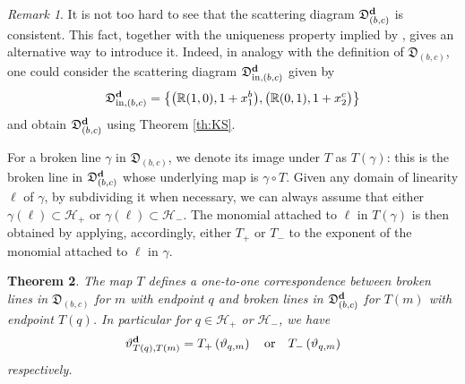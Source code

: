 \documentclass[11pt]{amsart}
\newtheorem{theorem}{Theorem}[section]
\theoremstyle{remark}
\newtheorem{remark}[theorem]{Remark}
\numberwithin{equation}{section}
\newcommand{\RR}{\mathbb{R}}
\newcommand{\fD}{\mathfrak{D}}
\newcommand{\bfd}{{\bf d}}
\begin{document}
\begin{remark}
  It is not too hard to see that the scattering diagram $\fD_{(b,c)}^\bfd$ is
  consistent. This fact, together with the uniqueness property implied by
  \cite[Theorem 1.7]{GHKK}, gives an alternative way to introduce it. Indeed, in
  analogy with the definition of $\fD_{(b,c)}$, one could consider the
  scattering diagram
  $\fD_{\mathrm{in},(b,c)}^\bfd$ given by 
  \[
    \fD_{\mathrm{in},(b,c)}^\bfd=
    \left\{
      \big(\RR (1,0), 1+x_1^b\big), 
      \big(\RR (0,1), 1+x_2^c\big)
    \right\}
  \]
  and obtain $\fD_{(b,c)}^\bfd$ using Theorem \ref{th:KS}. 
\end{remark}

For a broken line $\gamma$ in $\fD_{(b,c)}$, we denote its image under $T$ as
$T(\gamma)$: this is the broken line in $\fD_{(b,c)}^\bfd$ whose underlying map
is $\gamma\circ T$. Given any domain of linearity $\ell$ of $\gamma$, by
subdividing it when necessary, we can always assume that either $\gamma(\ell)
\subset \mathcal{H}_{+} $ or $\gamma(\ell)\subset \mathcal{H}_{-}$. The monomial
attached to $\ell$ in $T(\gamma)$ is then obtained by applying, accordingly, either
$T_+$ or $T_-$ to the exponent of the monomial attached to $\ell$ in $\gamma$.

\begin{theorem}
  \label{thm:T_on_broken_lines}
  The map $T$ defines a one-to-one correspondence between broken lines in $\fD_{(b,c)}$
  for $m$ with endpoint $q$ and broken lines in $\fD_{(b,c)}^\bfd$ for $T(m)$
  with endpoint $T(q)$. In particular for $q \in \mathcal{H}_+$ or $\mathcal{H}_-$,
  we have
  \[ 
    \vartheta^\bfd_{T(q),T( m)} = 
    T_{+} \left(\vartheta_{q, m}\right) 
    \quad
    \mbox{or} 
    \quad
    T_{-} \left(\vartheta_{q, m}\right)
  \]
  respectively.
\end{theorem}
\end{document}

